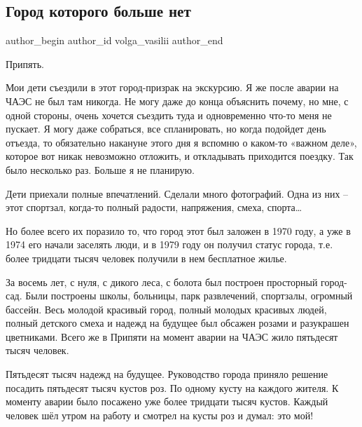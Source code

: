  
 
 
 
 
 
\subsection{Город которого больше нет}
\label{sec:19_11_2020.fb.volga_vasilii.1.gorod_pripjat}
\ifcmt
	author_begin
   author_id volga_vasilii
	author_end
\fi


Припять. 

Мои дети съездили в этот город-призрак на экскурсию. Я же после аварии на ЧАЭС
не был там никогда. Не могу даже до конца объяснить почему, но мне, с одной
стороны, очень хочется съездить туда и одновременно что-то меня не пускает. Я
могу даже собраться, все спланировать, но когда подойдет день отъезда, то
обязательно накануне этого дня я вспомню о каком-то «важном деле», которое вот
никак невозможно отложить, и откладывать приходится поездку. Так было несколько
раз. Больше я не планирую. 

Дети приехали полные впечатлений. Сделали много фотографий. Одна из них – этот
спортзал, когда-то полный радости, напряжения, смеха, спорта… 

Но более всего их поразило то, что город этот был заложен в 1970 году, а уже в
1974 его начали заселять люди, и в 1979 году он получил статус города, т.е.
более тридцати тысяч человек получили в нем бесплатное жилье. 

За восемь лет, с нуля, с дикого леса, с болота был построен просторный
город-сад. Были построены школы, больницы, парк развлечений, спортзалы,
огромный бассейн. Весь молодой красивый город, полный молодых красивых людей,
полный детского смеха и надежд на будущее был обсажен розами и разукрашен
цветниками. Всего же в Припяти на момент аварии на ЧАЭС жило пятьдесят тысяч
человек. 

Пятьдесят тысяч надежд на будущее. Руководство города приняло решение посадить
пятьдесят тысяч кустов роз. По одному кусту на каждого жителя. К моменту аварии
было посажено уже более тридцати тысяч кустов. Каждый человек шёл утром на
работу и смотрел на кусты роз и думал: это мой!

